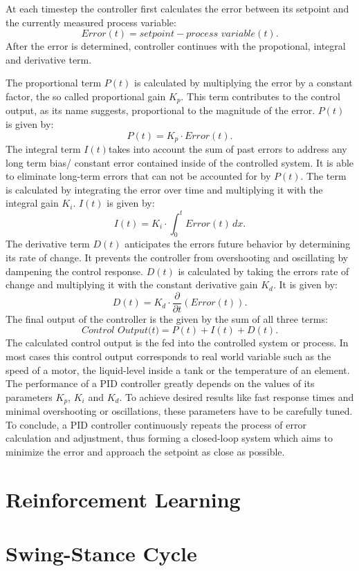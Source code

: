 At each timestep the controller first calculates the error between its setpoint and the currently measured process variable: 
\[
	Error(t) = setpoint - \textit{process variable}(t)
.\]
After the error is determined, controller continues with the propotional, integral and derivative term.

The proportional term $P(t)$ is calculated by multiplying the error by a constant factor, the so called proportional gain $K_p$.
This term contributes to the control output, as its name suggests, proportional to the magnitude of the error.
$P(t)$ is given by:
\[
	P(t) = K_p \cdot Error(t)
.\]
The integral term $I(t)$takes into account the sum of past errors to address any long term bias/ constant error contained inside of the controlled system.
It is able to eliminate long-term errors that can not be accounted for by $P(t)$.
The term is calculated by integrating the error over time and multiplying it with the integral gain $K_i$.
$I(t)$ is given by:
\[
	I(t) = K_i \cdot \int_{0}^{t} Error(t) \,dx
.\]
The derivative term $D(t)$ anticipates the errors future behavior by determining its rate of change.
It prevents the controller from overshooting and oscillating by dampening the control response.
$D(t)$ is calculated by taking the errors rate of change and multiplying it with the constant derivative gain $K_d$.
It is given by:
\[
	D(t) = K_d \cdot \frac{\partial}{\partial t}(Error(t))
.\]
The final output of the controller is the given by the sum of all three terms:
\[
	\textit{Control Output(t)} = P(t) + I(t) + D(t)
.\]
The calculated control output is the fed into the controlled system or process.
In most cases this control output corresponds to real world variable such as the speed of a motor, the liquid-level inside a tank or the temperature of an element.
The performance of a PID controller greatly depends on the values of its parameters $K_p$, $K_i$ and $K_d$.
To achieve desired results like fast response times and minimal overshooting or oscillations, these parameters have to be carefully tuned. 
To conclude, a PID controller continuously repeats the process of error calculation and adjustment, thus forming a closed-loop system which aims to minimize the error and approach the setpoint as close as possible.




\section{Reinforcement Learning}

\section{Swing-Stance Cycle}
